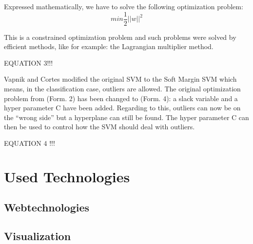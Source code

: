 \documentclass{scrartcl}
\begin{document}
Expressed mathematically, we have to solve the following optimization problem: 
\[min \frac{1}{2}||w||^{2} \]

This is a constrained optimization problem and such problems were solved by efficient methods, like for example: the Lagrangian multiplier method.

EQUATION 3!!!

Vapnik and Cortes modified the original SVM to the Soft Margin SVM which means, in the classification case, outliers are allowed. The original optimization problem from (Form. 2) has been changed to (Form. 4): a slack variable and a hyper parameter C have been added. Regarding to this, outliers can now be on the “wrong side” but a hyperplane can still be found. The hyper parameter C can then be used to control how the SVM should deal with outliers. 

EQUATION 4 !!!


\section{Used Technologies}

\subsection{Webtechnologies}

\subsection{Visualization}
\end{document}
